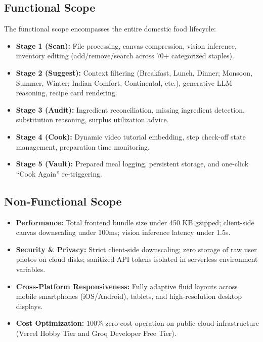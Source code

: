 \subsection*{Functional Scope}
The functional scope encompasses the entire domestic food lifecycle:
\begin{itemize}
    \item \textbf{Stage 1 (Scan):} File processing, canvas compression, vision inference, inventory editing (add/remove/search across 70+ categorized staples).
    \item \textbf{Stage 2 (Suggest):} Context filtering (Breakfast, Lunch, Dinner; Monsoon, Summer, Winter; Indian Comfort, Continental, etc.), generative LLM reasoning, recipe card rendering.
    \item \textbf{Stage 3 (Audit):} Ingredient reconciliation, missing ingredient detection, substitution reasoning, surplus utilization advice.
    \item \textbf{Stage 4 (Cook):} Dynamic video tutorial embedding, step check-off state management, preparation time monitoring.
    \item \textbf{Stage 5 (Vault):} Prepared meal logging, persistent storage, and one-click “Cook Again” re-triggering.
\end{itemize}

\subsection*{Non-Functional Scope}
\begin{itemize}
    \item \textbf{Performance:} Total frontend bundle size under 450 KB gzipped; client-side canvas downscaling under 100ms; vision inference latency under 1.5s.
    \item \textbf{Security \& Privacy:} Strict client-side downscaling; zero storage of raw user photos on cloud disks; sanitized API tokens isolated in serverless environment variables.
    \item \textbf{Cross-Platform Responsiveness:} Fully adaptive fluid layouts across mobile smartphones (iOS/Android), tablets, and high-resolution desktop displays.
    \item \textbf{Cost Optimization:} $100\%$ zero-cost operation on public cloud infrastructure (Vercel Hobby Tier and Groq Developer Free Tier).
\end{itemize}

